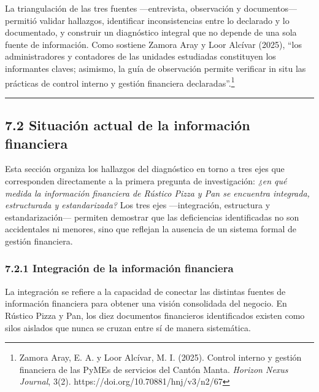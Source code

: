\documentclass[
  12pt,
  spanish,
]{article}
\begin{document}
La triangulación de las tres fuentes ---entrevista, observación y
documentos--- permitió validar hallazgos, identificar inconsistencias
entre lo declarado y lo documentado, y construir un diagnóstico integral
que no depende de una sola fuente de información. Como sostiene Zamora
Aray y Loor Alcívar (2025), ``los administradores y contadores de las
unidades estudiadas constituyen los informantes claves; asimismo, la
guía de observación permite verificar in situ las prácticas de control
interno y gestión financiera declaradas''.\footnote{Zamora Aray, E. A. y
  Loor Alcívar, M. I. (2025). Control interno y gestión financiera de
  las PyMEs de servicios del Cantón Manta. \emph{Horizon Nexus Journal},
  3(2). https://doi.org/10.70881/hnj/v3/n2/67}

\begin{center}\rule{0.5\linewidth}{0.5pt}\end{center}

\hypertarget{situaciuxf3n-actual-de-la-informaciuxf3n-financiera}{%
\subsection{7.2 Situación actual de la información
financiera}\label{situaciuxf3n-actual-de-la-informaciuxf3n-financiera}}

Esta sección organiza los hallazgos del diagnóstico en torno a tres ejes
que corresponden directamente a la primera pregunta de investigación:
\emph{¿en qué medida la información financiera de Rústico Pizza y Pan se
encuentra integrada, estructurada y estandarizada?} Los tres ejes
---integración, estructura y estandarización--- permiten demostrar que
las deficiencias identificadas no son accidentales ni menores, sino que
reflejan la ausencia de un sistema formal de gestión financiera.

\hypertarget{integraciuxf3n-de-la-informaciuxf3n-financiera}{%
\subsubsection{7.2.1 Integración de la información
financiera}\label{integraciuxf3n-de-la-informaciuxf3n-financiera}}

La integración se refiere a la capacidad de conectar las distintas
fuentes de información financiera para obtener una visión consolidada
del negocio. En Rústico Pizza y Pan, los diez documentos financieros
identificados existen como silos aislados que nunca se cruzan entre sí
de manera sistemática.
\end{document}
